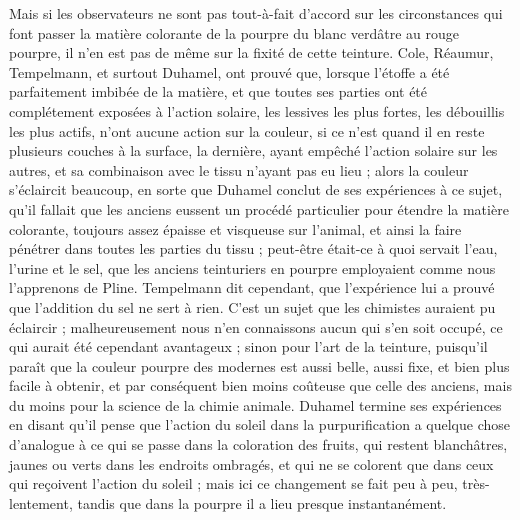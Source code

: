 \documentclass[a4paper, 11pt, oneside, polutonikogreek, french]{article}
\begin{document}
Mais si les observateurs ne sont pas tout-à-fait d'accord sur les circonstances qui font passer la matière colorante de la pourpre du blanc verdâtre au rouge pourpre, il n'en est pas de même sur la fixité de cette teinture. Cole, Réaumur, Tempelmann, et surtout Duhamel, ont prouvé que, lorsque l'étoffe a été parfaitement imbibée de la matière, et que toutes ses parties ont été complétement exposées à l'action solaire, les lessives les plus fortes, les débouillis les plus actifs, n'ont aucune action sur la couleur, si ce n'est quand il en reste plusieurs couches à la surface, la dernière, ayant empêché l'action solaire sur les autres, et sa combinaison avec le tissu n'ayant pas eu lieu ; alors la couleur s'éclaircit beaucoup, en sorte que Duhamel conclut de ses expériences à ce sujet, qu'il fallait que les anciens eussent un procédé particulier pour étendre la matière colorante, toujours assez épaisse et visqueuse sur l'animal, et ainsi la faire pénétrer dans toutes les parties du tissu ; peut-être était-ce à quoi servait l'eau, l'urine et le sel, que les anciens teinturiers en pourpre employaient comme nous l'apprenons de Pline. Tempelmann dit cependant, que l'expérience lui a prouvé que l'addition du sel ne sert à rien. C'est un sujet que les chimistes auraient pu éclaircir ; malheureusement nous n'en connaissons aucun qui s'en soit occupé, ce qui aurait été cependant avantageux ; sinon pour l'art de la teinture, puisqu'il paraît que la couleur pourpre des modernes est aussi belle, aussi fixe, et bien plus facile à obtenir, et par conséquent bien moins coûteuse que celle des anciens, mais du moins pour la science de la chimie animale. Duhamel termine ses expériences en disant qu'il pense que l'action du soleil dans la purpurification a quelque chose d'analogue à ce qui se passe dans la coloration des fruits, qui restent blanchâtres, jaunes ou verts dans les endroits ombragés, et qui ne se colorent que dans ceux qui reçoivent l'action du soleil ; mais ici ce changement se fait peu à peu, très-lentement, tandis que dans la pourpre il a lieu presque instantanément.
\end{document}
